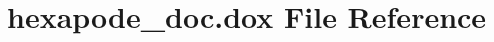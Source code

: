 \hypertarget{hexapode__doc_8dox}{\section{hexapode\-\_\-doc.\-dox File Reference}
\label{hexapode__doc_8dox}
}
